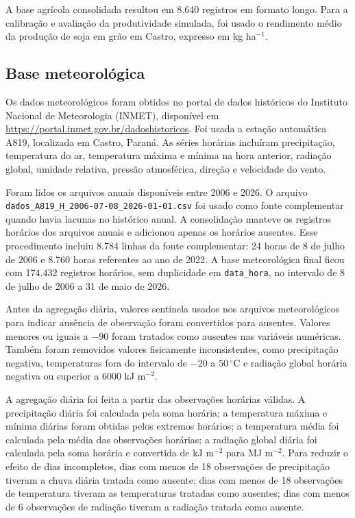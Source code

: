 A base agrícola consolidada resultou em 8.640 registros em formato longo. Para a
calibração e avaliação da produtividade simulada, foi usado o rendimento médio
da produção de soja em grão em Castro, expresso em kg ha$^{-1}$.

\subsection{Base meteorológica}
\label{subsec:base_meteorologica}

Os dados meteorológicos foram obtidos no portal de dados históricos do Instituto
Nacional de Meteorologia (INMET), disponível em
\url{https://portal.inmet.gov.br/dadoshistoricos}. Foi usada a estação
automática A819, localizada em Castro, Paraná. As séries horárias incluíram
precipitação, temperatura do ar, temperatura máxima e mínima na hora anterior,
radiação global, umidade relativa, pressão atmosférica, direção e velocidade do
vento.

Foram lidos os arquivos anuais disponíveis entre 2006 e 2026. O arquivo
\texttt{dados\_A819\_H\_2006-07-08\_2026-01-01.csv} foi usado como fonte
complementar quando havia lacunas no histórico anual. A consolidação manteve os
registros horários dos arquivos anuais e adicionou apenas os horários ausentes.
Esse procedimento incluiu 8.784 linhas da fonte complementar: 24 horas de 8 de
julho de 2006 e 8.760 horas referentes ao ano de 2022. A base meteorológica
final ficou com 174.432 registros horários, sem duplicidade em
\texttt{data\_hora}, no intervalo de 8 de julho de 2006 a 31 de maio de 2026.

Antes da agregação diária, valores sentinela usados nos arquivos meteorológicos
para indicar ausência de observação foram convertidos para ausentes. Valores
menores ou iguais a $-90$ foram tratados como ausentes nas variáveis numéricas.
Também foram removidos valores fisicamente inconsistentes, como precipitação
negativa, temperaturas fora do intervalo de $-20$ a $50\,^\circ$C e radiação
global horária negativa ou superior a 6000 kJ m$^{-2}$.

A agregação diária foi feita a partir das observações horárias válidas. A
precipitação diária foi calculada pela soma horária; a temperatura máxima e
mínima diárias foram obtidas pelos extremos horários; a temperatura média foi
calculada pela média das observações horárias; a radiação global diária foi
calculada pela soma horária e convertida de kJ m$^{-2}$ para MJ m$^{-2}$.
Para reduzir o efeito de dias incompletos, dias com menos de 18 observações de
precipitação tiveram a chuva diária tratada como ausente; dias com menos de 18
observações de temperatura tiveram as temperaturas tratadas como ausentes; dias
com menos de 6 observações de radiação tiveram a radiação tratada como ausente.

